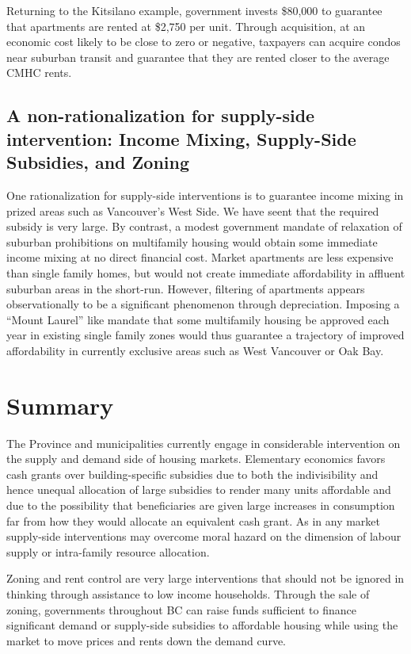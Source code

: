 \documentclass[12pt]{article}
\begin{document}
Returning to the Kitsilano example, government invests \$80,000 to guarantee that apartments are rented at \$2,750 per unit. Through acquisition, at an economic cost likely to be close to zero or negative, taxpayers can acquire condos near suburban transit and guarantee that they are rented closer to the average CMHC rents. 

\subsection{A non-rationalization for supply-side intervention: Income Mixing, Supply-Side Subsidies, and Zoning}

One rationalization for supply-side interventions is to guarantee income mixing in prized areas such as Vancouver's West Side. We have seent that the required subsidy is very large. By contrast, a modest government mandate of relaxation of suburban prohibitions on multifamily housing would obtain some immediate income mixing at no direct financial cost. Market apartments are less expensive than single family homes, but would not create immediate affordability in affluent suburban areas in the short-run. However, filtering of apartments appears observationally to be a significant phenomenon through depreciation. Imposing a ``Mount Laurel'' like mandate that some multifamily housing be approved each year in existing single family zones would thus guarantee a trajectory of improved affordability in currently exclusive areas such as West Vancouver or Oak Bay.

\section{Summary}

The Province and municipalities currently engage in considerable intervention on the supply and demand side of housing markets. Elementary economics favors cash grants over building-specific subsidies due to both the indivisibility and hence unequal allocation of large subsidies to render many units affordable and due to the possibility that beneficiaries are given large increases in consumption far from how they would allocate an equivalent cash grant. As in any market supply-side interventions may overcome moral hazard on the dimension of labour supply or intra-family resource allocation. 

Zoning and rent control are very large interventions that should not be ignored in thinking through assistance to low income households. Through the sale of zoning, governments throughout BC can raise funds sufficient to finance significant demand or supply-side subsidies to affordable housing while using the market to move prices and rents down the demand curve. 
\end{document}
